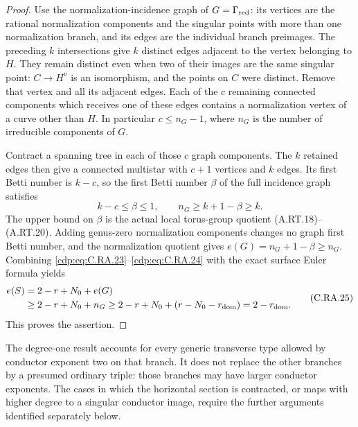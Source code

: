 \begin{proof}
Use the normalization-incidence graph of
$G=\Gamma_{\rm red}$: its vertices are the rational
normalization components and the singular points with
more than one normalization branch, and its edges are
the individual branch preimages. The preceding $k$
intersections give $k$ distinct edges adjacent to the
vertex belonging to $H$. They remain distinct even
when two of their images are the same singular point:
$C\to H^\nu$ is an isomorphism, and the points on $C$
were distinct. Remove that vertex and all its adjacent
edges. Each of the $c$ remaining connected components
which receives one of these edges contains a
normalization vertex of a curve other than $H$.
In particular $c\le n_G-1$, where $n_G$ is the number
of irreducible components of $G$.

Contract a spanning tree in each of those $c$ graph
components. The $k$ retained edges then give a connected
multistar with $c+1$ vertices and $k$ edges. Its first
Betti number is $k-c$, so the first Betti number
$\beta$ of the full incidence graph satisfies
\[
             k-c\le\beta\le1,
          \qquad n_G\ge k+1-\beta\ge k.
\tag{C.RA.24}\label{cdp:eq:C.RA.24}
\]
The upper bound on $\beta$ is the actual local torus-group
quotient (A.RT.18)--(A.RT.20). Adding genus-zero
normalization components changes no graph first Betti
number, and the normalization quotient gives
$e(G)=n_G+1-\beta\ge n_G$. Combining \eqref{cdp:eq:C.RA.23}--\eqref{cdp:eq:C.RA.24}
with the exact surface Euler formula yields
\[
\begin{split}
 e(S)&=2-r+N_0+e(G)\\
     &\ge2-r+N_0+n_G
      \ge2-r+N_0+(r-N_0-r_{\rm dom})
       =2-r_{\rm dom}.
\end{split}
\tag{C.RA.25}\label{cdp:eq:C.RA.25}
\]
This proves the assertion.
\end{proof}

The degree-one result accounts for every generic transverse
type allowed by conductor exponent two on that branch. It
does not replace the other branches by a presumed ordinary
triple: those branches may have larger conductor exponents.
The cases in which the horizontal section is contracted, or
maps with higher degree to a singular conductor image, require
the further arguments identified separately below.


